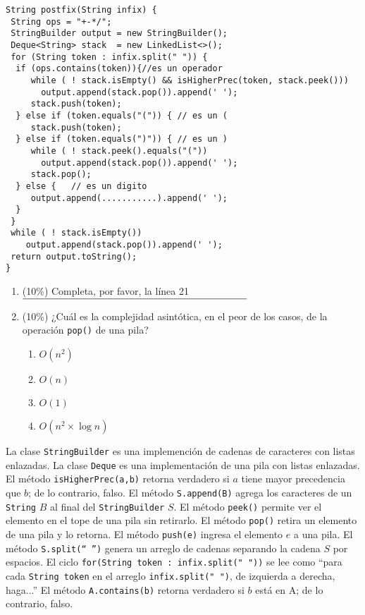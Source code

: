 \documentclass[10 pt]{article}
\begin{document}
\begin{multicols}{2}
{\footnotesize
\begin{lstlisting}
String postfix(String infix) {
 String ops = "+-*/";
 StringBuilder output = new StringBuilder();
 Deque<String> stack  = new LinkedList<>();
 for (String token : infix.split(" ")) {
  if (ops.contains(token)){//es un operador
     while ( ! stack.isEmpty() && isHigherPrec(token, stack.peek()))
       output.append(stack.pop()).append(' ');
     stack.push(token);  
  } else if (token.equals("(")) { // es un (
     stack.push(token);
  } else if (token.equals(")")) { // es un )
     while ( ! stack.peek().equals("("))
       output.append(stack.pop()).append(' ');
     stack.pop();
  } else {   // es un digito
     output.append(...........).append(' ');
  }
 }
 while ( ! stack.isEmpty())
    output.append(stack.pop()).append(' ');
 return output.toString();
}
\end{lstlisting}
}

\begin{enumerate}[label=\alph*]
	\item (10\%) Completa, por favor, la línea 21\\
	$\rule{8cm}{0.15mm}$


	\item (10\%) ¿Cuál es la complejidad asintótica, en el peor de los casos, de la operación \texttt{pop()} de una pila?
	\begin{enumerate}[label=\roman*]
		\item $O(n^2)$
		\item $O(n)$
		\item $O(1)$
		\item $O(n^2 \times \log n)$
	\end{enumerate}
\end{enumerate}

{\small
La clase \texttt{StringBuilder} es una implemención de cadenas de caracteres 
con listas enlazadas. La clase \texttt{Deque} es una implementación de una
pila con listas enlazadas. El método \texttt{isHigherPrec(a,b)} retorna verdadero
si $a$ tiene mayor precedencia que $b$; de lo contrario, falso. El método \texttt{S.append(B)} agrega
los caracteres de un \texttt{String} $B$ al final del \texttt{StringBuilder} $S$. El método \texttt{peek()}
permite ver el elemento en el tope de una pila sin retirarlo. El método \texttt{pop()} retira un elemento
de una pila y lo retorna. El método \texttt{push(e)} ingresa el elemento $e$ a una pila. El método \texttt{S.split(`` '')}
genera un arreglo de cadenas separando la cadena $S$ por espacios. El ciclo \texttt{for(String token : infix.split(" "))} se lee como ``para cada \texttt{String token} en el arreglo \texttt{infix.split(" ")}, de izquierda a derecha, haga...'' El método \texttt{A.contains(b)} retorna verdadero si $b$ está en A; de lo contrario, falso.
}


\end{multicols}
\end{document}
